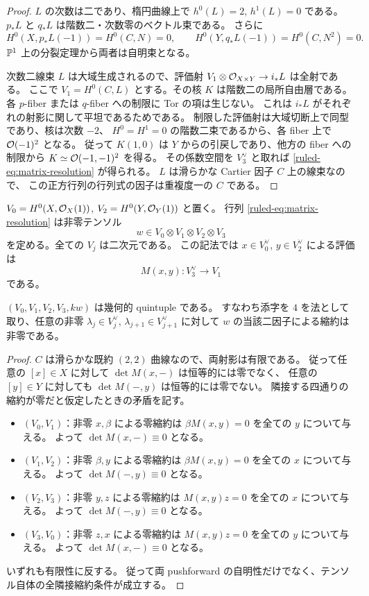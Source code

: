 \begin{proof}
$L$ の次数は二であり、楕円曲線上で $h^0(L)=2$, $h^1(L)=0$ である。
$p_*L$ と $q_*L$ は階数二・次数零のベクトル束である。
さらに
\[
 H^0(X,p_*L(-1))=H^0(C,N)=0,
 \qquad H^0(Y,q_*L(-1))=H^0(C,N^2)=0.
\]
$\mathbb P^1$ 上の分裂定理から両者は自明束となる。

次数二線束 $L$ は大域生成されるので、評価射
$V_1\otimes\mathcal O_{X\times Y}\to i_*L$ は全射である。
ここで $V_1=H^0(C,L)$ とする。その核 $K$ は階数二の局所自由層である。
各 $p$-fiber または $q$-fiber への制限に Tor の項は生じない。
これは $i_*L$ がそれぞれの射影に関して平坦であるためである。
制限した評価射は大域切断上で同型であり、核は次数 $-2$、
$H^0=H^1=0$ の階数二束であるから、各 fiber 上で $\mathcal O(-1)^2$ となる。
従って $K(1,0)$ は $Y$ からの引戻しであり、他方の fiber への制限から
$K\simeq\mathcal O(-1,-1)^2$ を得る。
その係数空間を $V_3^\vee$ と取れば \eqref{ruled-eq:matrix-resolution} が得られる。
$L$ は滑らかな Cartier 因子 $C$ 上の線束なので、
この正方行列の行列式の因子は重複度一の $C$ である。
\end{proof}

$V_0=H^0(X,\mathcal O_X(1))$, $V_2=H^0(Y,\mathcal O_Y(1))$ と置く。
行列 \eqref{ruled-eq:matrix-resolution} は非零テンソル
\[
 w\in V_0\otimes V_1\otimes V_2\otimes V_3
\]
を定める。全ての $V_j$ は二次元である。
この記法では $x\in V_0^\vee$, $y\in V_2^\vee$ による評価は
\[
 M(x,y):V_3^\vee\longrightarrow V_1
\]
である。

\begin{proposition}\label{ruled-prop:geometric}
$(V_0,V_1,V_2,V_3,kw)$ は幾何的 quintuple である。
すなわち添字を $4$ を法として取り、任意の非零
$\lambda_j\in V_j^\vee$, $\lambda_{j+1}\in V_{j+1}^\vee$ に対して
$w$ の当該二因子による縮約は非零である。
\end{proposition}

\begin{proof}
$C$ は滑らかな既約 $(2,2)$ 曲線なので、両射影は有限である。
従って任意の $[x]\in X$ に対して $\det M(x,-)$ は恒等的には零でなく、
任意の $[y]\in Y$ に対しても $\det M(-,y)$ は恒等的には零でない。
隣接する四通りの縮約が零だと仮定したときの矛盾を記す。
\begin{itemize}
\item $(V_0,V_1)$：非零 $x,\beta$ による零縮約は
  $\beta M(x,y)=0$ を全ての $y$ について与える。
  よって $\det M(x,-)\equiv0$ となる。
\item $(V_1,V_2)$：非零 $\beta,y$ による零縮約は
  $\beta M(x,y)=0$ を全ての $x$ について与える。
  よって $\det M(-,y)\equiv0$ となる。
\item $(V_2,V_3)$：非零 $y,z$ による零縮約は
  $M(x,y)z=0$ を全ての $x$ について与える。
  よって $\det M(-,y)\equiv0$ となる。
\item $(V_3,V_0)$：非零 $z,x$ による零縮約は
  $M(x,y)z=0$ を全ての $y$ について与える。
  よって $\det M(x,-)\equiv0$ となる。
\end{itemize}
いずれも有限性に反する。
従って両 pushforward の自明性だけでなく、テンソル自体の全隣接縮約条件が成立する。
\end{proof}

